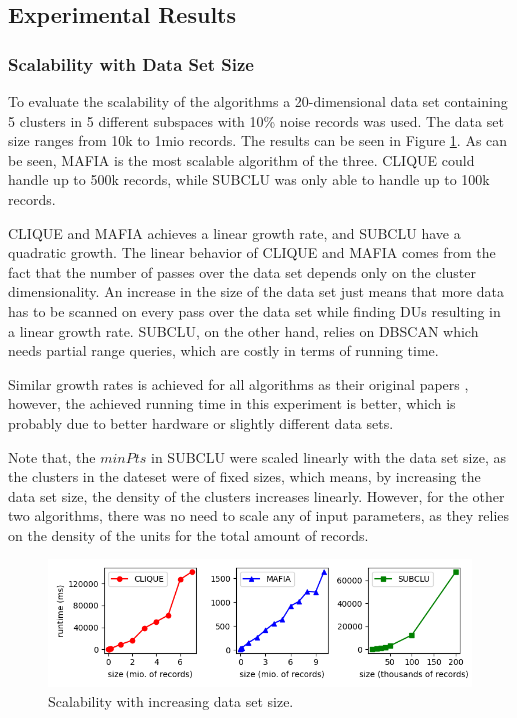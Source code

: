 \subsection{Experimental Results}

\subsubsection{Scalability with Data Set Size}
To evaluate the scalability of the algorithms a 20-dimensional data set containing 5 clusters in 5 different subspaces with 10\% noise records was used. The data set size ranges from 10k to 1mio records. The results can be seen in Figure \ref{fig:dataset_size_vs_runtime}. As can be seen, MAFIA is the most scalable algorithm of the three. CLIQUE could handle up to 500k records, while SUBCLU was only able to handle up to 100k records.

CLIQUE and MAFIA achieves a linear growth rate, and SUBCLU have a quadratic growth. The linear behavior of CLIQUE and MAFIA comes from the fact that the number of passes over the data set depends only on the cluster dimensionality. An increase in the size of the data set just means that more data has to be scanned on every pass over the data set while finding DUs resulting in a linear growth rate. SUBCLU, on the other hand, relies on DBSCAN which needs partial range queries, which are costly in terms of running time.

Similar growth rates is achieved for all algorithms as their original papers \cite{mafia,clique,subclu}, however, the achieved running time in this experiment is better, which is probably due to better hardware or slightly different data sets.

Note that, the $minPts$ in SUBCLU were scaled linearly with the data set size, as the clusters in the dateset were of fixed sizes, which means, by increasing the data set size, the density of the clusters increases linearly. However, for the other two algorithms, there was no need to scale any of input parameters, as they relies on the density of the units for the total amount of records.
\begin{figure}[H]
    \vspace*{-0.7cm}
    \centering
    \includegraphics[scale=0.45]{figures/dataset_size_vs_runtime.png}
    \caption{Scalability with increasing data set size.}
    \label{fig:dataset_size_vs_runtime}
    \vspace*{-0.7cm}
\end{figure}

